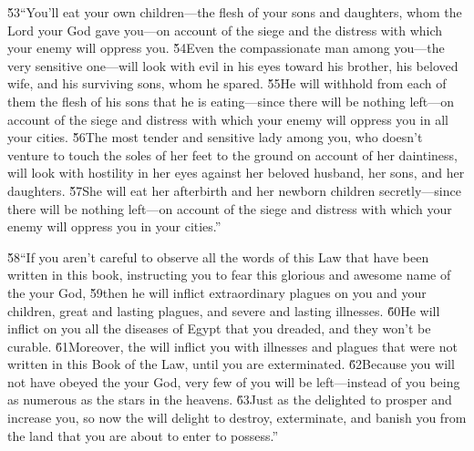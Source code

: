 \v{53}``You'll eat your own children---the flesh of your sons and daughters, whom the Lord your God gave you---on account of the siege and the distress with which your enemy will oppress you. \v{54}Even the compassionate man among you---the very sensitive one---will look with evil in his eyes toward his brother, his beloved wife, and his surviving sons, whom he spared. \v{55}He will withhold from each of them the flesh of his sons that he is eating---since there will be nothing left---on account of the siege and distress with which your enemy will oppress you in all your cities. \v{56}The most tender and sensitive lady among you, who doesn't venture to touch the soles of her feet to the ground on account of her daintiness, will look with hostility in her eyes against her beloved husband, her sons, and her daughters. \v{57}She will eat her afterbirth and her newborn children secretly---since there will be nothing left---on account of the siege and distress with which your enemy will oppress you in your cities.''

\v{58}``If you aren't careful to observe all the words of this Law that have been written in this book, instructing you to fear this glorious and awesome name of the  your God, \v{59}then he will inflict extraordinary plagues on you and your children, great and lasting plagues, and severe and lasting illnesses. \v{60}He will inflict on you all the diseases of Egypt that you dreaded, and they won't be curable. \v{61}Moreover, the  will inflict you with illnesses and plagues that were not written in this Book of the Law, until you are exterminated. \v{62}Because you will not have obeyed the  your God, very few of you will be left---instead of you being as numerous as the stars in the heavens. \v{63}Just as the  delighted to prosper and increase you, so now the  will delight to destroy, exterminate, and banish you from the land that you are about to enter to possess.''

